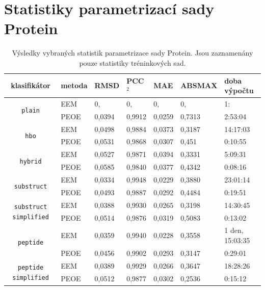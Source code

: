 
\chapter{Statistiky parametrizací sady Protein}
\label{proteinstat}
\begin{table}[h]
    \renewcommand{\arraystretch}{1.4}
    \centering
    \begin{tabular}{c|l|l|l|l|l|l}
         \textbf{klasifikátor} &  \textbf{metoda} & \textbf{RMSD} & \textbf{PCC$^2$} & \textbf{MAE} & \textbf{ABSMAX} & \textbf{doba výpočtu}\\
         \hline
         \multirow{2}{6em}{\texttt{plain}} & EEM & 0, & 0, & 0, & 0, & 1:  \\
         & PEOE & 0,0394 & 0,9912 & 0,0259 & 0,7313 & 2:53:04 \\
         \hline
         \multirow{2}{6em}{\texttt{hbo}} & EEM & 0,0498 & 0,9884 & 0,0373 & 0,3187 & 14:17:03 \\
         & PEOE & 0,0531 & 0,9868 & 0,0307 & 0,451 & 0:10:55 \\
         \hline
         \multirow{2}{6em}{\texttt{hybrid}} & EEM & 0,0527 & 0,9871 & 0,0394 & 0,3331 & 5:09:31 \\
         & PEOE & 0,0585 & 0,9840 & 0,0377 & 0,4342 & 0:08:16 \\
         \hline
         \multirow{2}{6em}{\texttt{substruct}} & EEM & 0,0334 & 0,9948 & 0,0229 & 0,3880 & 23:01:14 \\
         & PEOE & 0,0493 & 0,9887 & 0,0292 & 0,4484 & 0:19:51 \\
         \hline
         \multirow{2}{6em}{\texttt{substruct simplified}} & EEM & 0,0388 & 0,9930 & 0,0265 & 0,3198 & 14:30:45 \\
         & PEOE & 0,0514 & 0,9876 & 0,0319 & 0,5083 & 0:13:02 \\
         \hline
         \multirow{2}{6em}{\texttt{peptide}} & EEM & 0,0359 & 0,9940 & 0,0228 & 0,3558 & 1 den, 15:03:35 \\
         & PEOE & 0,0456 & 0,9902 & 0,0293 & 0,3147 & 0:29:01 \\
         \hline
         \multirow{2}{6em}{\texttt{peptide simplified}} & EEM & 0,0389 & 0,9929 & 0,0266 & 0,3647 & 18:28:26 \\
         & PEOE & 0,0512 & 0,9877 & 0,0302 & 0,2536 & 0:15:12
    \end{tabular}
    \caption{Výsledky vybraných statistik parametrizace sady Protein. Jsou zaznamenány pouze statistiky tréninkových sad.}
    \label{statistics_PDB}
\end{table}

